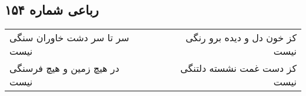 \begin{center}
\section*{رباعی شماره ۱۵۴}
\label{sec:sh154}
\begin{longtable}{l p{0.5cm} r}
سر تا سر دشت خاوران سنگی نیست
&&
کز خون دل و دیده برو رنگی نیست
\\
در هیچ زمین و هیچ فرسنگی نیست
&&
کز دست غمت نشسته دلتنگی نیست
\\
\end{longtable}
\end{center}
